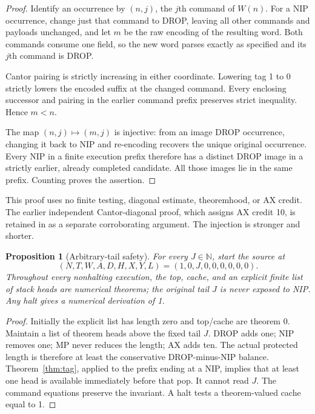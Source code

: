 \documentclass[11pt,a4paper]{article}
\newtheorem{proposition}[theorem]{Proposition}
\theoremstyle{remark}\newtheorem{remark}[theorem]{Remark}
\newcommand{\Nat}{\mathbb{N}}
\newcommand{\file}[1]{\texttt{\path{#1}}}
\begin{document}
\begin{proof}
Identify an occurrence by $(n,j)$, the $j$th command of $W(n)$. For a NIP occurrence, change just that command to DROP, leaving all other commands and payloads unchanged, and let $m$ be the raw encoding of the resulting word. Both commands consume one field, so the new word parses exactly as specified and its $j$th command is DROP.

Cantor pairing is strictly increasing in either coordinate. Lowering tag 1 to 0 strictly lowers the encoded suffix at the changed command. Every enclosing successor and pairing in the earlier command prefix preserves strict inequality. Hence $m<n$.

The map $(n,j)\mapsto(m,j)$ is injective: from an image DROP occurrence, changing it back to NIP and re-encoding recovers the unique original occurrence. Every NIP in a finite execution prefix therefore has a distinct DROP image in a strictly earlier, already completed candidate. All those images lie in the same prefix. Counting proves the assertion.
\end{proof}

This proof uses no finite testing, diagonal estimate, theoremhood, or AX credit. The earlier independent Cantor-diagonal proof, which assigns AX credit 10, is retained in \file{proofs/zero_debt_review.md} as a separate corroborating argument. The injection is stronger and shorter.

\begin{proposition}[Arbitrary-tail safety]\label{prop:tail}
For every $J\in\Nat$, start the source at
\[
 (N,T,W,A,D,H,X,Y,L)=(1,0,J,0,0,0,0,0,0).
\]
Throughout every nonhalting execution, the top, cache, and an explicit finite list of stack heads are numerical theorems; the original tail $J$ is never exposed to NIP. Any halt gives a numerical derivation of 1.
\end{proposition}

\begin{proof}
Initially the explicit list has length zero and top/cache are theorem 0. Maintain a list of theorem heads above the fixed tail $J$. DROP adds one; NIP removes one; MP never reduces the length; AX adds ten. The actual protected length is therefore at least the conservative DROP-minus-NIP balance. Theorem~\ref{thm:tag}, applied to the prefix ending at a NIP, implies that at least one head is available immediately before that pop. It cannot read $J$. The command equations preserve the invariant. A halt tests a theorem-valued cache equal to 1.
\end{proof}
\end{document}
